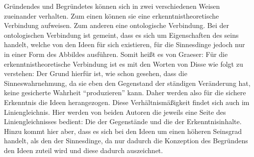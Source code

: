 Gründendes und Begründetes können sich in zwei verschiedenen Weisen zueinander verhalten. Zum einen können sie eine erkenntnistheoretische Verbindung aufweisen. Zum anderen eine ontologische Verbindung. Bei der ontologischen Verbindung ist gemeint, dass es sich um Eigenschaften des seins handelt, welche von den Ideen für sich existieren, für die Sinnesdinge jedoch nur in einer Form des Abbildes ausführen. Somit heißt es von Graeser:
Für die erkenntnistheoretische Verbindung ist es mit den Worten von Disse wie folgt zu verstehen:
Der Grund hierfür ist, wie schon gesehen, dass die Sinneswahrnehmung, da sie eben den Gegenstand der ständigen Veränderung hat, keine gesicherte Wahrheit \enquote{produzieren} kann. Daher werden also für die sichere Erkenntnis die Ideen herangezogen. 
Diese Verhältnismäßigkeit findet sich auch im Liniengleichnis. Hier werden von beiden Autoren die jeweils eine Seite des Liniengleichnisses bedient: Die der Gegenstände und die der Erkenntnisinhalte. Hinzu kommt hier aber, dass es sich bei den Ideen um einen höheren Seinsgrad handelt, als den der Sinnesdinge, da nur dadurch die Konzeption des Begründens den Ideen zuteil wird und diese dadurch auszeichnet.
